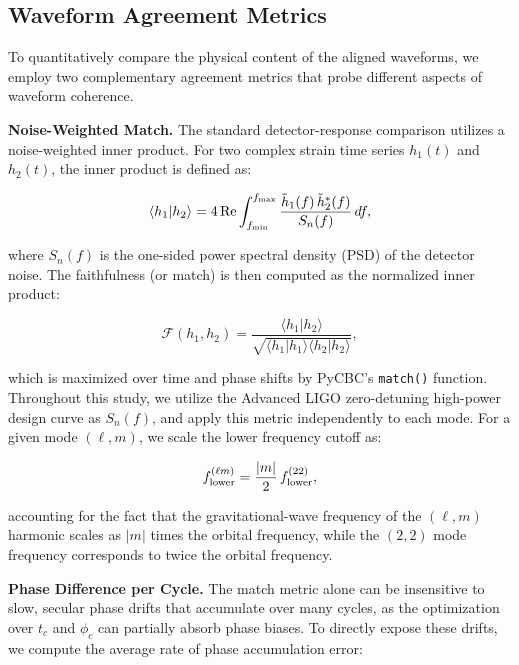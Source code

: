 \documentclass[%
 reprint,
superscriptaddress,
 amsmath,amssymb,
 aps,
]{revtex4-2}
\begin{document}
\subsection{Waveform Agreement Metrics}

To quantitatively compare the physical content of the aligned waveforms, we employ two complementary agreement metrics that probe different aspects of waveform coherence.

\textbf{Noise-Weighted Match.} The standard detector-response comparison utilizes a noise-weighted inner product. For two complex strain time series $h_1(t)$ and $h_2(t)$, the inner product is defined as:

\begin{equation}\langle h_1 | h_2 \rangle = 4\,\mathrm{Re} \int_{f_{\rm min}}^{f_{\rm max}} \frac{\tilde{h}_1(f)\,\tilde{h}_2^*(f)}{S_n(f)}\, df,\end{equation}

where $S_n(f)$ is the one-sided power spectral density (PSD) of the detector noise. The faithfulness (or match) is then computed as the normalized inner product:

\begin{equation}\mathcal{F}(h_1, h_2) = \frac{\langle h_1 | h_2 \rangle}{\sqrt{\langle h_1 | h_1 \rangle \langle h_2 | h_2 \rangle}},\end{equation}

which is maximized over time and phase shifts by PyCBC's \texttt{match()} function. Throughout this study, we utilize the Advanced LIGO zero-detuning high-power design curve as $S_n(f)$, and apply this metric independently to each mode. For a given mode $(\ell, m)$, we scale the lower frequency cutoff as:

\begin{equation}f_{\rm lower}^{(\ell m)} = \frac{|m|}{2}\, f_{\rm lower}^{(22)},\end{equation}

accounting for the fact that the gravitational-wave frequency of the $(\ell,m)$ harmonic scales as $|m|$ times the orbital frequency, while the $(2,2)$ mode frequency corresponds to twice the orbital frequency.

\textbf{Phase Difference per Cycle.} The match metric alone can be insensitive to slow, secular phase drifts that accumulate over many cycles, as the optimization over $t_c$ and $\phi_c$ can partially absorb phase biases. To directly expose these drifts, we compute the average rate of phase accumulation error:
\end{document}
